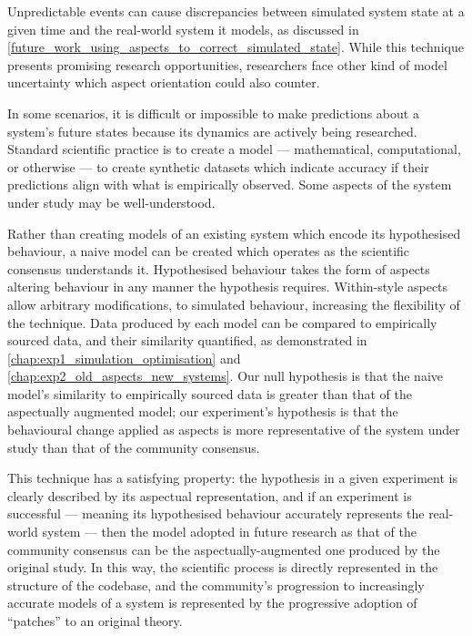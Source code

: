 Unpredictable events can cause discrepancies between simulated system state at a
given time and the real-world system it models, as discussed in
\cref{future_work_using_aspects_to_correct_simulated_state}. While this
technique presents promising research opportunities, researchers face other kind
of model uncertainty which aspect orientation could also counter.

In some scenarios, it is difficult or impossible to make predictions about a
system's future states because its dynamics are actively being researched.
Standard scientific practice is to create a model --- mathematical,
computational, or otherwise --- to create synthetic datasets which indicate
accuracy if their predictions align with what is empirically observed.
 Some aspects of the system under study may be
well-understood.

Rather than creating models of an existing system which encode its hypothesised
behaviour, a naive model can be created which operates as the scientific
consensus understands it. Hypothesised behaviour takes the form of aspects
altering behaviour in any manner the hypothesis requires. Within-style aspects
allow arbitrary modifications, to simulated behaviour, increasing the
flexibility of the technique. Data produced by each model can be compared to
empirically sourced data, and their similarity quantified, as demonstrated in
\cref{chap:exp1_simulation_optimisation} and
\cref{chap:exp2_old_aspects_new_systems}. Our null hypothesis is that the naive
model's similarity to empirically sourced data is greater than that of the
aspectually augmented model; our experiment's hypothesis is that the behavioural
change applied as aspects is more representative of the system under study than
that of the community consensus.

This technique has a satisfying property: the hypothesis in a given experiment is
clearly described by its aspectual representation, and if an experiment is
successful --- meaning its hypothesised behaviour accurately represents the
real-world system --- then the model adopted in future research as that of the
community consensus can be the aspectually-augmented one produced by the
original study. In this way, the scientific process is directly represented in
the structure of the codebase, and the community's progression to increasingly
accurate models of a system is represented by the progressive adoption of
``patches'' to an original theory.

